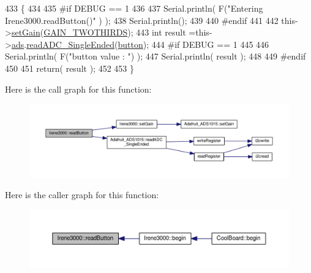 \begin{DoxyCode}
433 \{
434 
435 \textcolor{preprocessor}{#if DEBUG == 1 }
436 
437     Serial.println( F(\textcolor{stringliteral}{"Entering Irene3000.readButton()"} ) );
438     Serial.println();
439 
440 \textcolor{preprocessor}{#endif }
441 
442     this->\hyperlink{class_irene3000_aff7c5da186b388e7272e63ff88a20c34}{setGain}(\hyperlink{_cool_adafruit___a_d_s1015_8h_a3d6c0e15829a207b9155890811fa4781a879d688347ec0bf159fe1278db602f68}{GAIN\_TWOTHIRDS});
443     \textcolor{keywordtype}{int} result =this->\hyperlink{class_irene3000_a1215e77ba761c9908d80d691f149e135}{ads}.\hyperlink{class_adafruit___a_d_s1015_a40f38b9e1f3ec397c0670dd632510235}{readADC\_SingleEnded}(\hyperlink{_irene3000_8h_a37976ee6fe1fb8546bfd6153b83ffa6c}{button});
444 \textcolor{preprocessor}{#if DEBUG == 1}
445     
446     Serial.println( F(\textcolor{stringliteral}{"button value : "}) );
447     Serial.println( result );
448 
449 \textcolor{preprocessor}{#endif }
450 
451     \textcolor{keywordflow}{return}( result );
452     
453 \}
\end{DoxyCode}
Here is the call graph for this function\+:\nopagebreak
\begin{figure}[H]
\begin{center}
\leavevmode
\includegraphics[width=350pt]{d6/d03/class_irene3000_a78a87eb7cf295b95c12b2ebd51c2bb77_cgraph}
\end{center}
\end{figure}
Here is the caller graph for this function\+:\nopagebreak
\begin{figure}[H]
\begin{center}
\leavevmode
\includegraphics[width=350pt]{d6/d03/class_irene3000_a78a87eb7cf295b95c12b2ebd51c2bb77_icgraph}
\end{center}
\end{figure}
\mbox{\label{class_irene3000_a436fc0a06681cd0784aba56b9707f19a}} 
